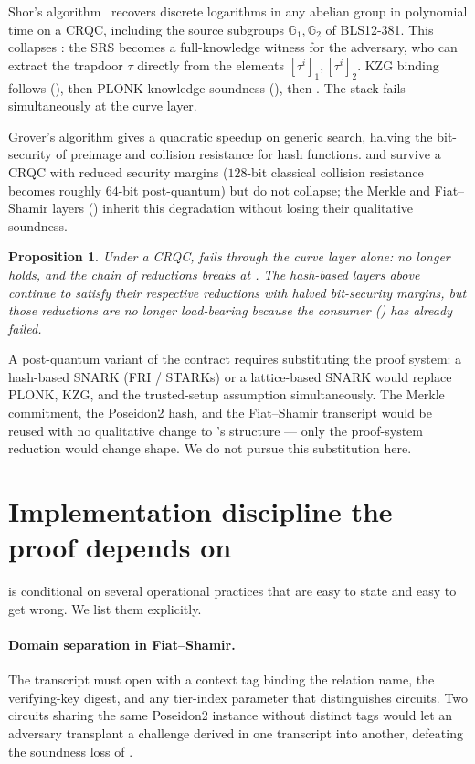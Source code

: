 \documentclass[11pt,a4paper]{article}
\theoremstyle{plain}
\newtheorem{proposition}{Proposition}
\theoremstyle{definition}
\newcommand{\Gone}{\mathbb{G}_1}
\newcommand{\Gtwo}{\mathbb{G}_2}
\begin{document}
Shor's algorithm~\cite{shor-1994-quantum} recovers discrete
logarithms in any abelian group in polynomial time on a CRQC,
including the source subgroups $\Gone, \Gtwo$ of BLS12-381. This
collapses : the SRS becomes a full-knowledge
witness for the adversary, who can extract the trapdoor $\tau$
directly from the elements $[\tau^i]_1, [\tau^i]_2$. KZG
binding follows (), then PLONK knowledge
soundness (), then . The stack
fails simultaneously at the curve layer.

Grover's algorithm gives a quadratic speedup on generic search,
halving the bit-security of preimage and collision resistance
for hash functions.  and  survive a
CRQC with reduced security margins ($128$-bit classical
collision resistance becomes roughly $64$-bit post-quantum) but
do not collapse; the Merkle and Fiat--Shamir layers
() inherit this degradation without
losing their qualitative soundness.

\begin{proposition}
Under a CRQC,  fails through the curve layer
alone:  no longer holds, and the chain of
reductions breaks at . The hash-based layers
above continue to satisfy their respective reductions with
halved bit-security margins, but those reductions are no
longer load-bearing because the consumer
() has already failed.
\end{proposition}

A post-quantum variant of the contract requires substituting the
proof system: a hash-based SNARK (FRI / STARKs) or a lattice-based
SNARK would replace PLONK, KZG, and the trusted-setup
assumption simultaneously. The Merkle commitment, the Poseidon2
hash, and the Fiat--Shamir transcript would be reused with no
qualitative change to 's structure --- only the
proof-system reduction would change shape. We do not pursue this
substitution here.

\section{Implementation discipline the proof depends on}
\label{sec:notes}

 is conditional on several operational practices
that are easy to state and easy to get wrong. We list them
explicitly.

\paragraph{Domain separation in Fiat--Shamir.} The transcript
must open with a context tag binding the relation name, the
verifying-key digest, and any tier-index parameter that
distinguishes circuits. Two circuits sharing the same Poseidon2
instance without distinct tags would let an adversary transplant
a challenge derived in one transcript into another, defeating
the soundness loss of .
\end{document}
